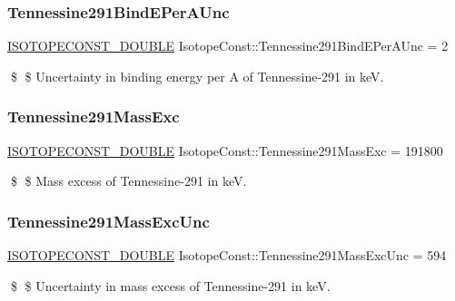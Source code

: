 \subsubsection{\texorpdfstring{Tennessine291\+Bind\+E\+Per\+A\+Unc}{Tennessine291BindEPerAUnc}}
{\footnotesize\ttfamily \mbox{\hyperlink{group___isotope_const-_macros_ga8f45a7272ce02c0b4c65c44636ed719a}{I\+S\+O\+T\+O\+P\+E\+C\+O\+N\+S\+T\+\_\+\+D\+O\+U\+B\+LE}} Isotope\+Const\+::\+Tennessine291\+Bind\+E\+Per\+A\+Unc = 2}

\$ \$ Uncertainty in binding energy per A of Tennessine-\/291 in keV. \mbox{\label{group___isotope_const-_tennessine-_ts291_ga02556fb075c15b94a60c7ba526f4cd3b}} 
\subsubsection{\texorpdfstring{Tennessine291\+Mass\+Exc}{Tennessine291MassExc}}
{\footnotesize\ttfamily \mbox{\hyperlink{group___isotope_const-_macros_ga8f45a7272ce02c0b4c65c44636ed719a}{I\+S\+O\+T\+O\+P\+E\+C\+O\+N\+S\+T\+\_\+\+D\+O\+U\+B\+LE}} Isotope\+Const\+::\+Tennessine291\+Mass\+Exc = 191800}

\$ \$ Mass excess of Tennessine-\/291 in keV. \mbox{\label{group___isotope_const-_tennessine-_ts291_ga3da709fa50a22c466c375cf668a9f87e}} 
\subsubsection{\texorpdfstring{Tennessine291\+Mass\+Exc\+Unc}{Tennessine291MassExcUnc}}
{\footnotesize\ttfamily \mbox{\hyperlink{group___isotope_const-_macros_ga8f45a7272ce02c0b4c65c44636ed719a}{I\+S\+O\+T\+O\+P\+E\+C\+O\+N\+S\+T\+\_\+\+D\+O\+U\+B\+LE}} Isotope\+Const\+::\+Tennessine291\+Mass\+Exc\+Unc = 594}

\$ \$ Uncertainty in mass excess of Tennessine-\/291 in keV. \mbox{\label{group___isotope_const-_tennessine-_ts291_gade7536a8262245beff50d101ffd6d92c}} 
